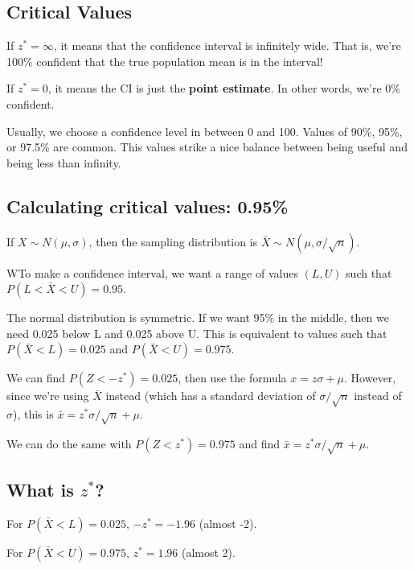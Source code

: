 \documentclass[
  letterpaper,
  DIV=11,
  numbers=noendperiod]{scrreprt}
\begin{document}
\hypertarget{critical-values}{%
\subsection{Critical Values}\label{critical-values}}

If \(z^* = \infty\), it means that the confidence interval is infinitely
wide. That is, we're 100\% confident that the true population mean is in
the interval!

If \(z^* = 0\), it means the CI is just the \textbf{point estimate}. In
other words, we're 0\% confident.

Usually, we choose a confidence level in between 0 and 100. Values of
90\%, 95\%, or 97.5\% are common. This values strike a nice balance
between being useful and being less than infinity.

\hypertarget{calculating-critical-values-0.95}{%
\subsection{Calculating critical values:
0.95\%}\label{calculating-critical-values-0.95}}

If \(X\sim N(\mu, \sigma)\), then the sampling distribution is
\(\bar X\sim N(\mu,\sigma/\sqrt{n})\).

WTo make a confidence interval, we want a range of values \((L, U)\)
such that \(P(L < \bar X < U) = 0.95\).

The normal distribution is symmetric. If we want 95\% in the middle,
then we need 0.025 below L and 0.025 above U. This is equivalent to
values such that \(P(\bar X < L) = 0.025\) and
\(P(\bar X < U) = 0.975\).

We can find \(P(Z < -z^*) = 0.025\), then use the formula
\(x = z\sigma+\mu\). However, since we're using \(\bar X\) instead
(which has a standard deviation of \(\sigma/\sqrt{n}\) instead of
\(\sigma\)), this is \(\bar x = z^*\sigma/\sqrt{n} + \mu\).

We can do the same with \(P(Z < z^*) = 0.975\) and find
\(\bar x = z^*\sigma/\sqrt n + \mu\).

\hypertarget{what-is-z}{%
\subsection{\texorpdfstring{What is
\(z^*\)?}{What is z\^{}*?}}\label{what-is-z}}

For \(P(\bar X < L) = 0.025\), \(-z^* = -1.96\) (almost -2).

For \(P(\bar X < U) = 0.975\), \(z^* = 1.96\) (almost 2).\newline
\end{document}
